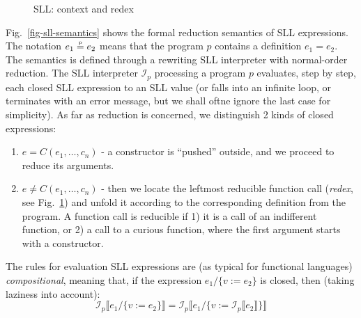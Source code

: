 \begin{figure}[t!]
\caption{SLL: context and redex}

\label{fig-sll-context}
\end{figure}

Fig.~\ref{fig-sll-semantics} shows the formal reduction semantics of SLL expressions.
The notation $e_1 \stackrel{\textrm{\tiny p}}{=} e_2$ means that the program $p$ contains a definition $e_1 = e_2$.
The semantics is defined through a rewriting SLL interpreter with normal-order reduction.
The SLL interpreter $\mathcal{I}_p$ processing a program $p$ evaluates, step by step,
each closed SLL expression to an SLL value (or falls into an infinite loop,
or terminates with an error message, but we shall oftne ignore the last case for simplicity).
As far as reduction is concerned, we distinguish 2 kinds of closed expressions:
\begin{enumerate}
  \item $e = C(e_1, \ldots, c_n)$ - a constructor is ``pushed'' outside, and we 
  proceed to reduce its arguments.
  \item $e \not = C(e_1, \ldots, c_n)$ - then we locate the leftmost reducible function call
  (\emph{redex}, see Fig.~\ref{fig-sll-context}) and unfold it according to
  the corresponding definition from the program.
  A function call is reducible if 
  1) it is a call of an indifferent function, or
  2) a call to a curious function, where the first argument starts with a constructor.
\end{enumerate}



The rules for evaluation SLL expressions are (as typical for functional languages) \emph{compositional},
meaning that, if the expression $e_1 / \{v := e_2\}$ is closed, then
(taking laziness into account):
\[\mathcal{I}_p\llbracket e_1 / \{v := e_2\}\rrbracket = \mathcal{I}_p \llbracket e_1 / \{v := \mathcal{I}_p\llbracket e_2\rrbracket\} \rrbracket\]

